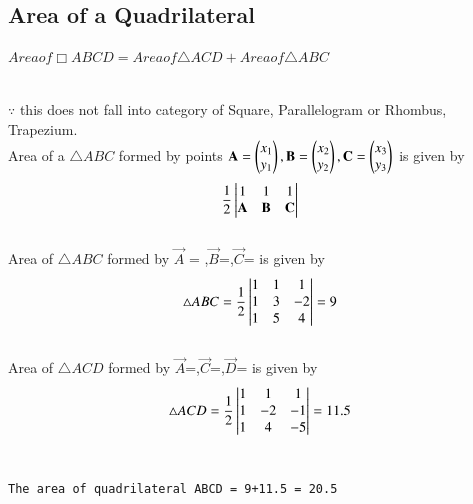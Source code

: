 \documentclass[journal,12pt,twocolumn]{IEEEtran}
\begin{document}
\subsection{\textbf{Area of a Quadrilateral}}
\begin{center}
    $Area of \Box ABCD = Area of \triangle ACD + Area of \triangle ABC $
\end{center}
\\
$\because$ this does not fall into category of Square, Parallelogram or Rhombus, Trapezium.
\\
Area of a $\triangle ABC$ formed by points $\mathbf{A}=\begin{pmatrix}x_1\\y_1\end{pmatrix},\mathbf{B}=\begin{pmatrix}x_2\\y_2\end{pmatrix},\mathbf{C}=\begin{pmatrix}x_3\\y_3\end{pmatrix}$ is given by
\begin{align}
\frac{1}{2}\begin{vmatrix}1 & 1 & 1\\ \mathbf{A} & \mathbf{B} & \mathbf{C} \end{vmatrix}
\end{align}
\\
Area of $\triangle ABC$ formed by
$\vec{A}$ = ,$\vec{B}$=,$\vec{C}$= is given by
\begin{align}
\triangle ABC = 
\frac{1}{2}\begin{vmatrix}
1 & 1 & 1\\1 & 3 & -2\\1 & 5 & 4\\\end{vmatrix}
= 9
\end{align}
\\
Area of $\triangle ACD$ formed by
$\vec{A}$=,$\vec{C}$=,$\vec{D}$= is given by\\
\begin{align}
\triangle ACD = 
\frac{1}{2}\begin{vmatrix}
1 & 1 & 1\\1 & -2 & -1\\1 & 4 & -5\\\end{vmatrix}
= 11.5
\end{align}
\\
\begin{lstlisting}
The area of quadrilateral ABCD = 9+11.5 = 20.5
\end{lstlisting}
\end{document}
